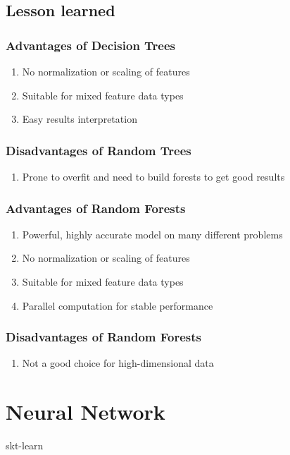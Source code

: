 \documentclass{article}
\begin{document}
	
\subsection{Lesson learned}
\subsubsection{Advantages of Decision Trees}
\begin{enumerate}
	\item No normalization or scaling of features
	\item Suitable for mixed feature data types
	\item Easy results interpretation
\end{enumerate}

\subsubsection{Disadvantages of Random Trees}
\begin{enumerate}
\item Prone to overfit and need to build forests to get good results
\end{enumerate}

\subsubsection{Advantages of Random Forests}
\begin{enumerate}
	\item Powerful, highly accurate model on many different problems
	\item No normalization or scaling of features
	\item Suitable for mixed feature data types
	\item Parallel computation for stable performance
\end{enumerate}

\subsubsection{Disadvantages of Random Forests}
\begin{enumerate}
	\item Not a good choice for high-dimensional data
\end{enumerate}

\section{Neural Network}
skt-learn
\end{document}
